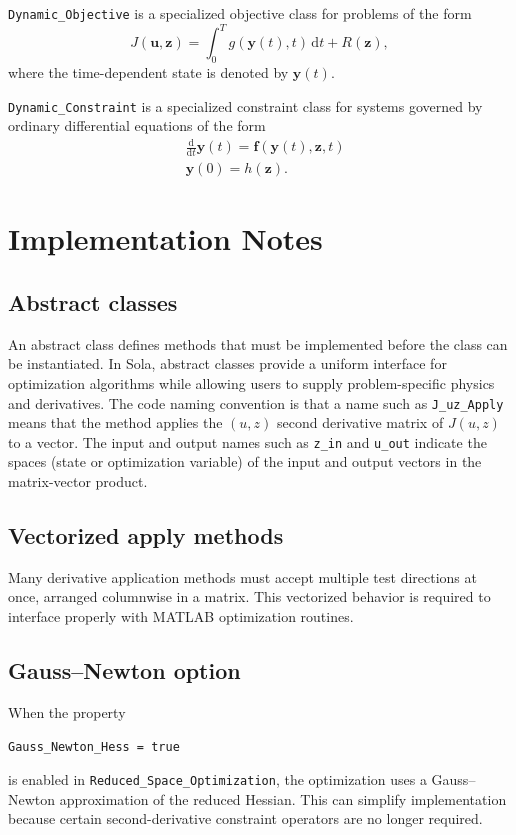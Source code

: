 \documentclass[11pt]{article}
\renewcommand{\u}{\bm{u}}
\newcommand{\z}{\bm{z}}
\newcommand{\y}{\bm{y}}
\newcommand{\fvec}{\bm{f}}
\newcommand{\0}{\bm{0}}
\newcommand{\dd}{\mathrm{d}}
\begin{document}
\texttt{Dynamic\_Objective} is a specialized objective class for problems of the form
\[
J(\u,\z) = \int_0^T g(\y(t),t)\,\dd t + R(\z),
\]
where the time-dependent state is denoted by \( \y(t) \).

\texttt{Dynamic\_Constraint} is a specialized constraint class for systems governed by ordinary differential equations of the form
\begin{align*}
& \frac{\dd}{\dd t}\y(t) = \fvec(\y(t),\z,t) \\
& \y(0) = h(\z) .
\end{align*}

\section*{Implementation Notes}

\subsection*{Abstract classes}

An abstract class defines methods that must be implemented before the class can be instantiated. In Sola, abstract classes provide a uniform interface for optimization algorithms while allowing users to supply problem-specific physics and derivatives. The code naming convention is that a name such as \texttt{J\_uz\_Apply} means that the method applies the $(u,z)$ second derivative matrix of $J(u,z)$ to a vector. The input and output names such as \texttt{z\_in} and \texttt{u\_out} indicate the spaces (state or optimization variable) of the input and output vectors in the matrix-vector product.

\subsection*{Vectorized apply methods}

Many derivative application methods must accept multiple test directions at once, arranged columnwise in a matrix. This vectorized behavior is required to interface properly with MATLAB optimization routines.

\subsection*{Gauss--Newton option}

When the property
\begin{center}
\texttt{Gauss\_Newton\_Hess = true}
\end{center}
is enabled in \texttt{Reduced\_Space\_Optimization}, the optimization uses a Gauss--Newton approximation of the reduced Hessian. This can simplify implementation because certain second-derivative constraint operators are no longer required.
\end{document}
